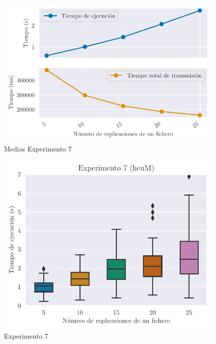 \begin{figure}[H]
    \centering
    \includegraphics{include/plots/ex7_means.pdf}
    \caption{Medias Experimento 7}%
    \label{fig:ex7means}
\end{figure}

\begin{figure}[H]
    \centering
    \includegraphics{include/plots/ex7_time_bplot.pdf}
    \caption{Experimento 7}%
    \label{fig:ex7time}
\end{figure}

